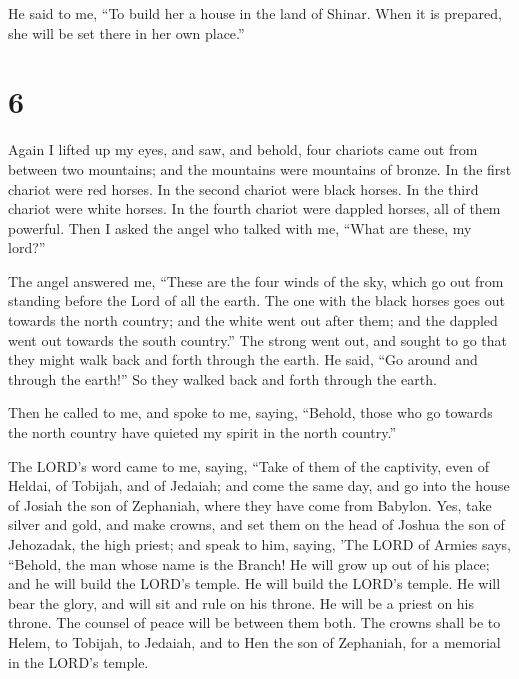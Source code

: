  He said to me, ``To build her a house in the land of
Shinar. When it is prepared, she will be set there in her own place.''

\hypertarget{section-5}{%
\section{6}\label{section-5}}

 Again I lifted up my eyes, and saw, and behold, four
chariots came out from between two mountains; and the mountains were
mountains of bronze.  In the first chariot were red
horses. In the second chariot were black horses.  In the
third chariot were white horses. In the fourth chariot were dappled
horses, all of them powerful.  Then I asked the angel who
talked with me, ``What are these, my lord?''

 The angel answered me, ``These are the four winds of the
sky, which go out from standing before the Lord of all the earth.
 The one with the black horses goes out towards the north
country; and the white went out after them; and the dappled went out
towards the south country.''  The strong went out, and
sought to go that they might walk back and forth through the earth. He
said, ``Go around and through the earth!'' So they walked back and forth
through the earth.

 Then he called to me, and spoke to me, saying, ``Behold,
those who go towards the north country have quieted my spirit in the
north country.''

 The LORD's word came to me, saying, 
``Take of them of the captivity, even of Heldai, of Tobijah, and of
Jedaiah; and come the same day, and go into the house of Josiah the son
of Zephaniah, where they have come from Babylon.  Yes,
take silver and gold, and make crowns, and set them on the head of
Joshua the son of Jehozadak, the high priest;  and speak
to him, saying, 'The LORD of Armies says, ``Behold, the man whose name
is the Branch! He will grow up out of his place; and he will build the
LORD's temple.  He will build the LORD's temple. He will
bear the glory, and will sit and rule on his throne. He will be a priest
on his throne. The counsel of peace will be between them both.
 The crowns shall be to Helem, to Tobijah, to Jedaiah,
and to Hen the son of Zephaniah, for a memorial in the LORD's temple.

